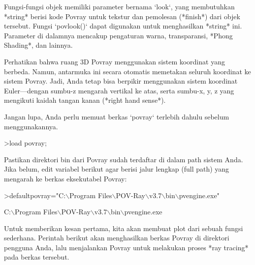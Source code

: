 \documentclass{article}
\newenvironment{eulernotebook}{\par}{\par}
\newenvironment{eulercomment}{\par\medskip}{\par\medskip}
\begin{document}
\begin{eulernotebook}
\begin{eulercomment}
Fungsi-fungsi objek memiliki parameter bernama `look`, yang
membutuhkan *string* berisi kode Povray untuk tekstur dan pemolesan
(*finish*) dari objek tersebut. Fungsi `povlook()` dapat digunakan
untuk menghasilkan *string* ini. Parameter di dalamnya mencakup
pengaturan warna, transparansi, *Phong Shading*, dan lainnya.

Perhatikan bahwa ruang 3D Povray menggunakan sistem koordinat yang
berbeda. Namun, antarmuka ini secara otomatis memetakan seluruh
koordinat ke sistem Povray. Jadi, Anda tetap bisa berpikir menggunakan
sistem koordinat Euler—dengan sumbu-\textdollar{}z\textdollar{} mengarah vertikal ke atas,
serta sumbu-\textdollar{}x, y, z\textdollar{} yang mengikuti kaidah tangan kanan (*right hand
sense*).

Jangan lupa, Anda perlu memuat berkas `povray` terlebih dahulu sebelum
menggunakannya.
\end{eulercomment}
\begin{eulerprompt}
>load povray;
\end{eulerprompt}
\begin{eulercomment}
Pastikan direktori bin dari Povray sudah terdaftar di dalam path
sistem Anda. Jika belum, edit variabel berikut agar berisi jalur
lengkap (full path) yang mengarah ke berkas eksekutabel Povray:
\end{eulercomment}
\begin{eulerprompt}
>defaultpovray="C:\(\backslash\)Program Files\(\backslash\)POV-Ray\(\backslash\)v3.7\(\backslash\)bin\(\backslash\)pvengine.exe"
\end{eulerprompt}
\begin{euleroutput}
  C:\(\backslash\)Program Files\(\backslash\)POV-Ray\(\backslash\)v3.7\(\backslash\)bin\(\backslash\)pvengine.exe
\end{euleroutput}
\begin{eulercomment}
Untuk memberikan kesan pertama, kita akan membuat plot dari sebuah
fungsi sederhana. Perintah berikut akan menghasilkan berkas Povray di
direktori pengguna Anda, lalu menjalankan Povray untuk melakukan
proses *ray tracing* pada berkas tersebut.


\end{eulercomment}
\end{eulernotebook}
\end{document}
